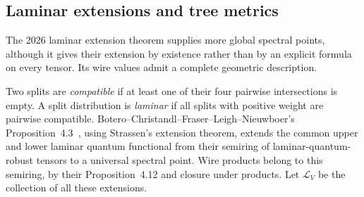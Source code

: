 \subsection{Laminar extensions and tree metrics}
The 2026 laminar extension theorem supplies more global spectral points, although it gives their extension by existence rather than by an explicit formula on every tensor.  Its wire values admit a complete geometric description.

Two splits are \emph{compatible} if at least one of their four pairwise intersections is empty.  A split distribution is \emph{laminar} if all splits with positive weight are pairwise compatible.  Botero--Christandl--Fraser--Leigh--Nieuwboer's Proposition~4.3~\cite{bcfln-quantum}, using Strassen's extension theorem, extends the common upper and lower laminar quantum functional from their semiring of laminar-quantum-robust tensors to a universal spectral point.  Wire products belong to this semiring, by their Proposition~4.12 and closure under products.  Let $\mathcal L_V$ be the collection of all these extensions.

